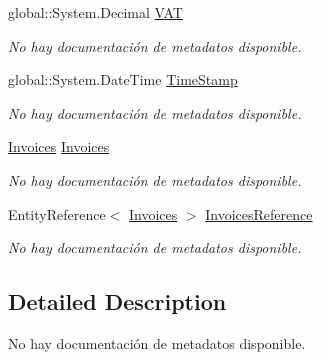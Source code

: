 \begin{DoxyCompactItemize}
global\-::\-System.\-Decimal \hyperlink{class_game_memory_1_1_invoice_details_a593bcc7bd0bcb2e41e6e531065413915}{V\-A\-T}
\begin{DoxyCompactList}\small\item\em No hay documentación de metadatos disponible. \end{DoxyCompactList}\item 
global\-::\-System.\-Date\-Time \hyperlink{class_game_memory_1_1_invoice_details_aa68004d539f2d3f74d809cf395085d5c}{Time\-Stamp}
\begin{DoxyCompactList}\small\item\em No hay documentación de metadatos disponible. \end{DoxyCompactList}\item 
\hyperlink{class_game_memory_1_1_invoices}{Invoices} \hyperlink{class_game_memory_1_1_invoice_details_a992833a86798d5b67073419b0106d7ec}{Invoices}
\begin{DoxyCompactList}\small\item\em No hay documentación de metadatos disponible. \end{DoxyCompactList}\item 
Entity\-Reference$<$ \hyperlink{class_game_memory_1_1_invoices}{Invoices} $>$ \hyperlink{class_game_memory_1_1_invoice_details_addfc996d0bd6283ba9558d5f84a8c781}{Invoices\-Reference}
\begin{DoxyCompactList}\small\item\em No hay documentación de metadatos disponible. \end{DoxyCompactList}\end{DoxyCompactItemize}


\subsection{Detailed Description}
No hay documentación de metadatos disponible. 



